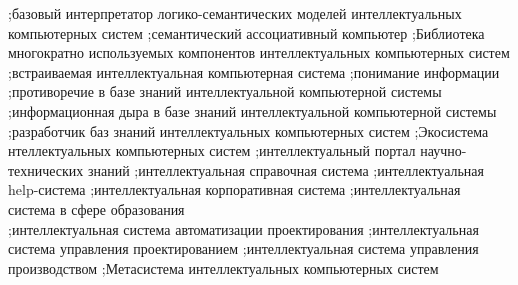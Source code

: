 {;базовый интерпретатор логико-семантических моделей интеллектуальных компьютерных систем
;семантический ассоциативный компьютер
;Библиотека многократно используемых компонентов интеллектуальных компьютерных систем
;встраиваемая интеллектуальная компьютерная система
;понимание информации
;противоречие в базе знаний интеллектуальной компьютерной системы
;информационная дыра в базе знаний интеллектуальной компьютерной системы\\
;разработчик баз знаний интеллектуальных компьютерных систем
;Экосистема нтеллектуальных компьютерных систем
;интеллектуальный портал научно-технических знаний
;интеллектуальная справочная система
;интеллектуальная help-система
;интеллектуальная корпоративная система
;интеллектуальная система в сфере образования\\
;интеллектуальная система автоматизации проектирования
;интеллектуальная система управления проектированием
;интеллектуальная система управления производством
;Метасистема интеллектуальных компьютерных систем
}

\newpage